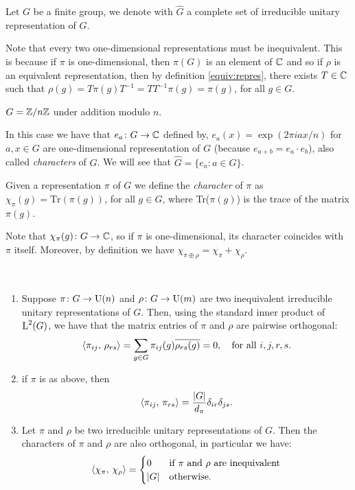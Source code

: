 \begin{defn}
Let $G$ be a finite group, we denote with $\hat{G}$ a complete set of irreducible unitary representation of $G$.
\end{defn}
\begin{rem}
Note that every two one-dimensional representations must be inequivalent. This is because if $\pi$ is one-dimensional, then $\pi(G)$ is an element of ${\mathbb C}$ and so if $\rho$ is an equivalent representation, then by definition \ref{equiv:repres}, there exists $T\in {\mathbb C}$ such that $\rho(g)=T\pi(g) T^{-1} = TT^{-1}\pi(g)=\pi(g)$, for all $g\in G$.
\end{rem}
\begin{exmp}
\label{exa:characters}
$G={\mathbb Z}/n{\mathbb Z}$ under addition modulo $n$.

In this case we have that $e_a\colon G\rightarrow {\mathbb C}$ defined by, $e_a(x)=\exp(2\pi iax/n)$ for $a,x\in G$ are one-dimensional representation of $G$ (because $e_{a+b}=e_a\cdot e_b$), also called \emph{characters} of $G$. We will see that $\hat{G}=\{e_a\colon a \in G\}$. 
\end{exmp}
\begin{defn}
Given a representation $\pi$ of $G$ we define the \emph{character} of $\pi$ as $\chi_\pi(g)=\text{Tr}(\pi(g))$, for all $g \in G$, where Tr($\pi(g)$) is the trace of the matrix $\pi(g)$.
\end{defn}
\begin{rem}
Note that $\chi_\pi(g)\colon G\rightarrow {\mathbb C}$, so if $\pi$ is one-dimensional, its character coincides with $\pi$ itself. Moreover, by definition we have $\chi_{\pi\oplus\rho}=\chi_{\pi} + \chi_\rho$.
\end{rem}
\begin{theorem}~ 
\label{thm:schurel}
\begin{enumerate}
\item Suppose $\pi\colon G\rightarrow \operatorname{U}(n)$ and $\rho\colon G\rightarrow \operatorname{U}(m)$ are two inequivalent irreducible unitary representations of $G$. Then, using the standard inner product of $\operatorname{L}^2(G)$, we have that the matrix entries of $\pi$ and $\rho$ are pairwise orthogonal:
\[
\braket{\pi_{ij},\, \rho_{rs}}=\sum_{g\in G}\pi_{ij}(g)\overline{\rho_{rs}(g)}=0, \quad \text{for all $i,j,r,s.$}
\]
\item if $\pi$ is as above, then 
\[
\braket{\pi_{ij},\, \pi_{rs}}=\frac{\lvert G\rvert}{d_\pi}\delta_{ir}\delta_{js}.
\]
\item Let $\pi$ and $\rho$ be two irreducible unitary representations of $G$. Then the characters of $\pi$ and $\rho$ are also orthogonal, in particular we have:
\[
\braket{\chi_\pi,\, \chi_\rho}=
\begin{cases}
0 &\text{if $\pi$ and $\rho$ are inequivalent} \\
\lvert G\rvert &\text{otherwise}.
\end{cases}
\]
\end{enumerate}
\end{theorem}
